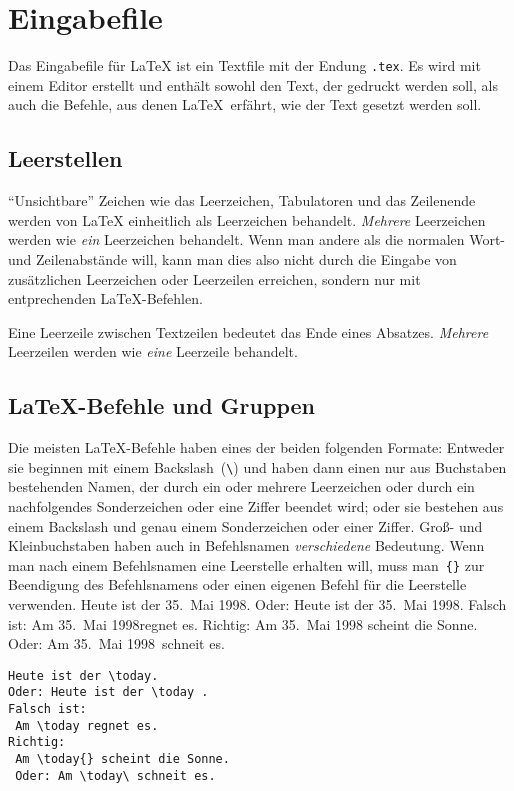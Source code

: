 \section{Eingabefile}
Das Eingabefile für \LaTeX{} ist ein Textfile mit der Endung \verb+.tex+.
Es wird mit einem Editor erstellt und enthält sowohl den Text, der gedruckt
werden soll, als auch die Befehle, aus denen \LaTeX\ erfährt,
wie der Text gesetzt werden soll.


\subsection{Leerstellen}
 
"`Unsichtbare"' Zeichen wie das Leerzeichen, Tabulatoren
und das Zeilenende werden von \LaTeX{}
einheitlich als Leerzeichen behandelt.  \emph{Mehrere}
Leerzeichen werden wie \emph{ein} Leerzeichen behandelt.   
Wenn man andere als die normalen Wort- und Zeilenabstände
will, kann man dies also nicht durch die Eingabe von
zusätzlichen Leerzeichen oder Leerzeilen erreichen, sondern
nur mit entprechenden \LaTeX-Befehlen.

Eine Leerzeile zwischen Textzeilen bedeutet das Ende eines 
Absatzes.  \emph{Mehrere} Leerzeilen werden wie \emph{eine}
Leerzeile behandelt.
 
 
\subsection{\LaTeX-Befehle und Gruppen}
 
Die meisten \LaTeX-Befehle haben eines der beiden folgenden
Formate: Entweder sie beginnen mit einem Backslash~(\verb|\|)
und haben dann einen nur aus Buchstaben bestehenden Namen, der
durch ein oder mehrere Leerzeichen oder durch ein nachfolgendes
Sonderzeichen oder eine Ziffer beendet wird; oder sie bestehen
aus einem Backslash und genau einem Sonderzeichen oder einer
Ziffer.
Groß- und Kleinbuchstaben haben auch in Befehlsnamen
\emph{verschiedene} Bedeutung.
Wenn man nach einem Befehlsnamen eine Leerstelle erhalten will,
muss man~\verb|{}| zur Beendigung des Befehlsnamens oder einen
eigenen Befehl für die Leerstelle verwenden.
\exa
\renewcommand{\today}{35.~Mai 1998}  %
Heute ist der \today.
Oder: Heute ist der \today .
Falsch ist: Am \today regnet es.
Richtig: Am \today{} scheint die Sonne.
Oder: Am \today\ schneit es.
\exb
\begin{verbatim}
Heute ist der \today.
Oder: Heute ist der \today .
Falsch ist:
 Am \today regnet es.
Richtig:
 Am \today{} scheint die Sonne.
 Oder: Am \today\ schneit es.
\end{verbatim}
\exc
 
